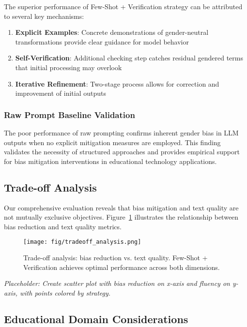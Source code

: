 The superior performance of Few-Shot + Verification strategy can be attributed to several key mechanisms:

\begin{enumerate}
    \item \textbf{Explicit Examples}: Concrete demonstrations of gender-neutral transformations provide clear guidance for model behavior
    \item \textbf{Self-Verification}: Additional checking step catches residual gendered terms that initial processing may overlook
    \item \textbf{Iterative Refinement}: Two-stage process allows for correction and improvement of initial outputs
\end{enumerate}

\subsubsection{Raw Prompt Baseline Validation}

The poor performance of raw prompting confirms inherent gender bias in LLM outputs when no explicit mitigation measures are employed. This finding validates the necessity of structured approaches and provides empirical support for bias mitigation interventions in educational technology applications.

\subsection{Trade-off Analysis}

Our comprehensive evaluation reveals that bias mitigation and text quality are not mutually exclusive objectives. Figure~\ref{fig:tradeoff_analysis} illustrates the relationship between bias reduction and text quality metrics.

\begin{figure}[htbp]
\centerline{\texttt{[image: fig/tradeoff\_analysis.png]}}
\caption{Trade-off analysis: bias reduction vs. text quality. Few-Shot + Verification achieves optimal performance across both dimensions.}
\label{fig:tradeoff_analysis}
\end{figure}

\textit{Placeholder: Create scatter plot with bias reduction on x-axis and fluency on y-axis, with points colored by strategy.}

\subsection{Educational Domain Considerations}

